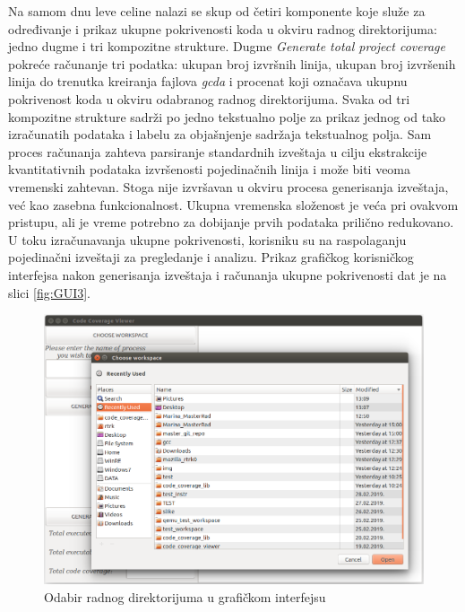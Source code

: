 \documentclass[12pt,oneside]{memoir}
\newcommand{\strano}[1]{\textit{#1}}
\begin{document}
Na samom dnu leve celine nalazi se skup od četiri komponente koje služe za određivanje i prikaz ukupne pokrivenosti koda u okviru radnog direktorijuma: jedno dugme i tri kompozitne strukture. Dugme \strano{Generate total project coverage} pokreće računanje tri podatka: ukupan broj izvršnih linija, ukupan broj izvršenih linija do trenutka kreiranja fajlova \strano{gcda} i procenat koji označava ukupnu pokrivenost koda u okviru odabranog radnog direktorijuma. Svaka od tri kompozitne strukture sadrži po jedno tekstualno polje za prikaz jednog od tako izračunatih podataka i labelu za objašnjenje sadržaja tekstualnog polja. Sam proces računanja zahteva parsiranje standardnih izveštaja u cilju ekstrakcije kvantitativnih podataka izvršenosti pojedinačnih linija i može biti veoma vremenski zahtevan. Stoga nije izvršavan u okviru procesa generisanja izveštaja, već kao zasebna funkcionalnost. Ukupna vremenska složenost je veća pri ovakvom pristupu, ali je vreme potrebno za dobijanje prvih podataka prilično redukovano. U toku izračunavanja ukupne pokrivenosti, korisniku su na raspolaganju pojedinačni izveštaji za pregledanje i analizu. Prikaz grafičkog korisničkog interfejsa nakon generisanja izveštaja i računanja ukupne pokrivenosti dat je na slici \ref{fig:GUI3}.

\begin{figure}[!ht]
  \centering
  \includegraphics[width=\textwidth]{img/GUI_2_ng.png}
  \caption{Odabir radnog direktorijuma u grafičkom interfejsu}
  \label{fig:GUI2}
\end{figure}
\end{document}
